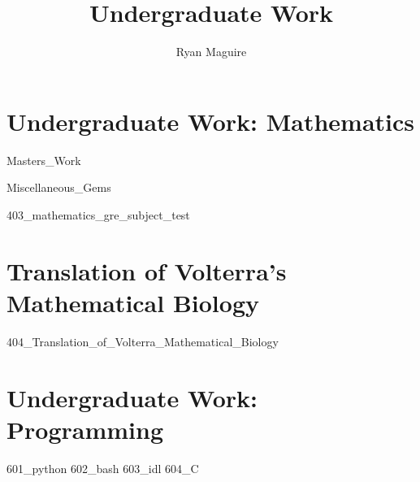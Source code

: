 \documentclass[crop=false,class=book,oneside]{standalone}
\begin{document}
    \newif\ifwork
    \ifstandalone
        \title{Undergraduate Work}
        \author{Ryan Maguire}
        \date{\vspace{-5ex}}
        \maketitle
        \tableofcontents
        \listoffigures
        \listoftables
        \clearpage
    \fi
    \part{Undergraduate Work: Mathematics}
        
                  {Masters_Work}
        
                  {Miscellaneous_Gems}
        
                  {403_mathematics_gre_subject_test}
    \part{Translation of Volterra's Mathematical Biology}
        
                  {404_Translation_of_Volterra_Mathematical_Biology}
    \part{Undergraduate Work: Programming}
        {601_python}
        {602_bash}
        {603_idl}
        {604_C}
\end{document}
